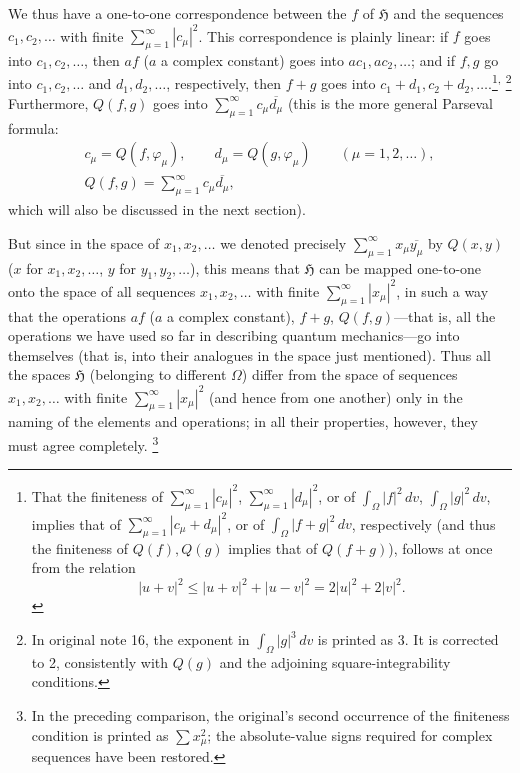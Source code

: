 \documentclass[fontsize=13pt,paper=b5,twoside,bookmarkpackage=false]{scrartcl}
\newcounter{translatornote}
\newcommand{\tnote}[1]{%
  \begingroup\stepcounter{translatornote}%
  \renewcommand{\thefootnote}{T\arabic{translatornote}}%
  \footnote[0]{#1}\endgroup}
\newcommand{\tnoteafter}[1]{\textsuperscript{,}\tnote{#1}}
\begin{document}
We thus have a one-to-one correspondence between the $f$ of $\mathfrak{H}$ and the sequences $c_1,c_2,\ldots$ with finite $\sum_{\mu=1}^{\infty}|c_\mu|^2$. This correspondence is plainly linear: if $f$ goes into $c_1,c_2,\ldots$, then $af$ ($a$ a complex constant) goes into $ac_1,ac_2,\ldots$; and if $f,g$ go into $c_1,c_2,\ldots$ and $d_1,d_2,\ldots$, respectively, then $f+g$ goes into $c_1+d_1,c_2+d_2,\ldots$.\footnote[16]{\label{fn:16}That the finiteness of $\sum_{\mu=1}^{\infty}|c_\mu|^2$, $\sum_{\mu=1}^{\infty}|d_\mu|^2$, or of $\int_\Omega|f|^2\,dv$, $\int_\Omega|g|^2\,dv$, implies that of $\sum_{\mu=1}^{\infty}|c_\mu+d_\mu|^2$, or of $\int_\Omega|f+g|^2\,dv$, respectively (and thus the finiteness of $Q(f),Q(g)$ implies that of $Q(f+g)$), follows at once from the relation
\[
|u+v|^2\le |u+v|^2+|u-v|^2=2|u|^2+2|v|^2.
\]
}\tnoteafter{In original note 16, the exponent in $\int_\Omega|g|^3\,dv$ is printed as 3. It is corrected to 2, consistently with $Q(g)$ and the adjoining square-integrability conditions.}
Furthermore, $Q(f,g)$ goes into $\sum_{\mu=1}^{\infty}c_\mu\overline{d_\mu}$ (this is the more general Parseval formula:
\begin{gather*}
c_\mu=Q(f,\varphi_\mu),\qquad d_\mu=Q(g,\varphi_\mu)
\qquad(\mu=1,2,\ldots),\\
Q(f,g)=\sum_{\mu=1}^{\infty}c_\mu\overline{d_\mu},
\end{gather*}
which will also be discussed in the next section).

But since in the space of $x_1,x_2,\ldots$ we denoted precisely $\sum_{\mu=1}^{\infty}x_\mu\overline{y_\mu}$ by $Q(x,y)$ ($x$ for $x_1,x_2,\ldots$, $y$ for $y_1,y_2,\ldots$), this means that $\mathfrak{H}$ can be mapped one-to-one onto the space of all sequences $x_1,x_2,\ldots$ with finite $\sum_{\mu=1}^{\infty}|x_\mu|^2$, in such a way that the operations $af$ ($a$ a complex constant), $f+g$, $Q(f,g)$---that is, all the operations we have used so far in describing quantum mechanics---go into themselves (that is, into their analogues in the space just mentioned). Thus all the spaces $\mathfrak{H}$ (belonging to different $\Omega$) differ from the space of sequences $x_1,x_2,\ldots$ with finite $\sum_{\mu=1}^{\infty}|x_\mu|^2$ (and hence from one another) only in the naming of the elements and operations; in all their properties, however, they must agree completely.\tnote{In the preceding comparison, the original's second occurrence of the finiteness condition is printed as $\sum x_\mu^2$; the absolute-value signs required for complex sequences have been restored.}
\end{document}
